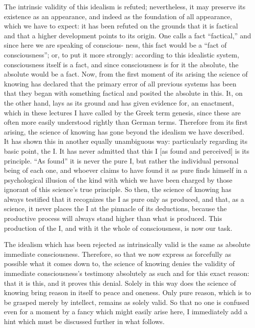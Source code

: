 The intrinsic validity of this idealism is refuted;
nevertheless, it may preserve its existence as an appearance,
and indeed as the foundation of all appearance,
which we have to expect:
it has been refuted on the grounds that it is factical
and that a higher development points to its origin.
One calls a fact
“factical,” and since here we are speaking of conscious-
ness, this fact would be a “fact of consciousness”;
or, to put it more strongly:
according to this idealistic system,
consciousness itself is a fact,
and since consciousness is for it the absolute,
the absolute would be a fact.
Now, from the first moment of its arising
the science of knowing has declared that the
primary error of all previous systems has been
that they began with something factical
and posited the absolute in this.
It, on the other hand, lays as its ground
and has given evidence for, an enactment,
which in these lectures I have called by the Greek term genesis,
since these are often more easily understood rightly than German terms.
Therefore from its first arising,
the science of knowing has gone beyond the idealism we have described.
It has shown this in another equally unambiguous way:
particularly regarding its basic point, the I.
It has never admitted that this I
[as found and perceived]
is its principle.
“As found” it is never the pure I,
but rather the individual personal being of each one,
and whoever claims to have found it as pure finds himself
in a psychological illusion of the kind
with which we have been charged by those
ignorant of this science’s true principle.
So then, the science of knowing has always testified
that it recognizes the I as pure only as produced,
and that, as a science, it never places the I
at the pinnacle of its deductions,
because the productive process will always stand
higher than what is produced.
This production of the I,
and with it the whole of consciousness,
is now our task.

The idealism which has been rejected as intrinsically valid is
the same as absolute immediate consciousness.
Therefore, so that we now express
as forcefully as possible what it comes down to,
the science of knowing denies the validity of
immediate consciousness’s testimony absolutely
as such and for this exact reason:
that it is this, and it proves this denial.
Solely in this way does the science of knowing
bring reason in itself to peace and oneness.
Only pure reason, which is to be grasped merely by intellect,
remains as solely valid.
So that no one is confused even for a moment
by a fancy which might easily arise here,
I immediately add a hint which must be discussed
further in what follows.

